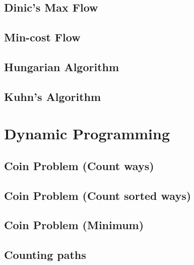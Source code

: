 \documentclass[10pt]{article}
\begin{document}
\begin{multicols*}{2}
\subsection{Dinic's Max Flow}


\subsection{Min-cost Flow}


\subsection{Hungarian Algorithm}


\subsection{Kuhn's Algorithm}


\section{Dynamic Programming}

\subsection{Coin Problem (Count ways)}


\subsection{Coin Problem (Count sorted ways)}


\subsection{Coin Problem (Minimum)}


\subsection{Counting paths}



\end{multicols*}
\end{document}
